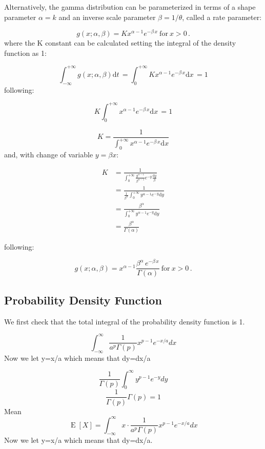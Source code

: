 \documentclass[]{report}
\begin{document}
Alternatively, the gamma distribution can be parameterized in terms of a shape parameter $\alpha = k$ and an inverse scale parameter $\beta = 1/\theta$, called a rate parameter:

\[ g(x;\alpha,\beta) = K x^{\alpha-1}  e^{-\beta\,x}   \ \mathrm{for}\ x > 0 \,\!.\]
where the K constant can be calculated setting the integral of the density function as 1:


\[\int_{-\infty}^{+\infty}g(x;\alpha,\beta) \mathrm{d}t \, = \int_{0}^{+\infty} K x^{\alpha-1}  e^{-\beta\,x}  \mathrm{d}x \, = 1\]
following:

\[
K \int_{0}^{+\infty} x^{\alpha-1}  e^{-\beta\,x}  \mathrm{d}x \, = 1\]

\[K = \frac{1}{\int_{0}^{+\infty} x^{\alpha-1}  e^{-\beta\,x}  \mathrm{d}x}\]
and, with change of variable $ y = \beta x  :$


\begin{align}
K &= \frac{1}{\int_{0}^{+\infty} \frac{y^{\alpha-1}}{\beta^{\alpha - 1}}  e^{-y}  \frac{\mathrm{d}y}{\beta}} \\
&= \frac{1}{\frac{1}{\beta^{\alpha}}\int_{0}^{+\infty} y^{\alpha-1}  e^{-y} \mathrm{d}y} \\
&= \frac{\beta^{\alpha}}{\int_{0}^{+\infty} y^{\alpha-1}  e^{-y}  \mathrm{d}y} \\
&= \frac{\beta^{\alpha}}{\Gamma(\alpha)}
\end{align}

following:

\[ g(x;\alpha,\beta) = x^{\alpha-1}  \frac{\beta^{\alpha} \, e^{-\beta\,x} }{\Gamma(\alpha)}  \ \mathrm{for}\ x > 0 \,\!.\]

\subsection{Probability Density Function}
We first check that the total integral of the probability density function is 1.

$$\int^\infty_{-\infty}\frac{1}{a^p \Gamma (p)} x^{p-1} e^{-x/a}dx$$
Now we let y=x/a which means that dy=dx/a

$$\frac{1}{ \Gamma (p)} \int^\infty_{0} y^{p-1} e^{-y}dy$$
$$\frac{1}{ \Gamma (p)} \Gamma (p)=1$$
Mean
\[\operatorname{E}[X]=\int^\infty_{-\infty}x \cdot \frac{1}{a^p \Gamma (p)} x^{p-1} e^{-x/a}dx\]
Now we let y=x/a which means that dy=dx/a.
\end{document}
